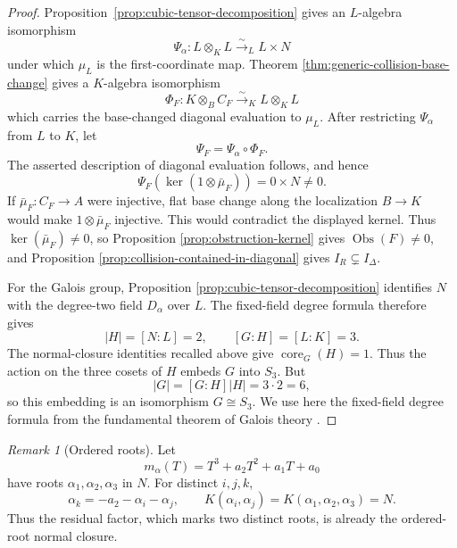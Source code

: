 \documentclass[11pt]{article}
\theoremstyle{remark}
\newtheorem*{remark}{Remark}
\DeclareMathOperator{\core}{core}
\newcommand{\Obs}{\operatorname{Obs}}
\begin{document}
\begin{proof}
Proposition~\ref{prop:cubic-tensor-decomposition} gives an \(L\)-algebra
isomorphism
\[
  \Psi_\alpha\colon L\otimes_KL\xrightarrow{\sim}_L L\times N
\]
under which \(\mu_L\) is the first-coordinate map.  Theorem
\ref{thm:generic-collision-base-change} gives a \(K\)-algebra isomorphism
\[
  \Phi_F\colon K\otimes_BC_F\xrightarrow{\sim}_K L\otimes_KL
\]
which carries the base-changed diagonal evaluation to \(\mu_L\).
After restricting \(\Psi_\alpha\) from \(L\) to \(K\), let
\[
  \Psi_F=\Psi_\alpha\circ\Phi_F.
\]
The asserted description of diagonal evaluation follows, and hence
\[
  \Psi_F\!\left(
    \ker(1\otimes\bar\mu_F)
  \right)
  =0\times N\neq0.
\]
If \(\bar\mu_F\colon C_F\to A\) were injective, flat base change along
the localization \(B\to K\) would make \(1\otimes\bar\mu_F\) injective.
This would contradict the displayed kernel.  Thus
\(\ker(\bar\mu_F)\neq0\), so Proposition
\ref{prop:obstruction-kernel} gives \(\Obs(F)\neq0\), and Proposition
\ref{prop:collision-contained-in-diagonal} gives
\(I_R\subsetneq I_\Delta\).

For the Galois group, Proposition
\ref{prop:cubic-tensor-decomposition} identifies \(N\) with the
degree-two field \(D_\alpha\) over \(L\).  The fixed-field degree formula
therefore gives
\[
  |H|=[N:L]=2,
  \qquad
  [G:H]=[L:K]=3.
\]
The normal-closure identities recalled above give \(\core_G(H)=1\).
Thus the action on the three cosets of \(H\) embeds \(G\) into \(S_3\).
But
\[
  |G|=[G:H]|H|=3\cdot2=6,
\]
so this embedding is an isomorphism \(G\cong S_3\).  We use here the
fixed-field degree formula from the fundamental theorem of Galois theory
\cite{StacksFundamentalGaloisTheory}.
\end{proof}

\begin{remark}[Ordered roots]
Let
\[
  m_\alpha(T)=T^3+a_2T^2+a_1T+a_0
\]
have roots \(\alpha_1,\alpha_2,\alpha_3\) in \(N\).  For distinct
\(i,j,k\),
\[
  \alpha_k=-a_2-\alpha_i-\alpha_j,
  \qquad
  K(\alpha_i,\alpha_j)
  =
  K(\alpha_1,\alpha_2,\alpha_3)
  =
  N.
\]
Thus the residual factor, which marks two distinct roots, is already
the ordered-root normal closure.
\end{remark}
\end{document}
